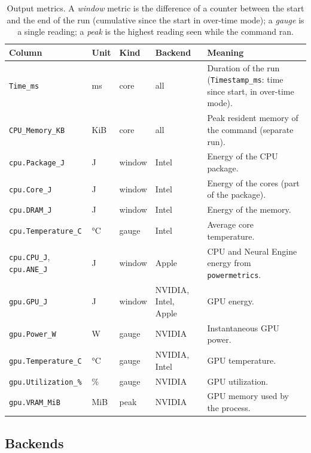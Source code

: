 \begin{table}[t]
    \centering
    \caption{Output metrics. A \emph{window} metric is the difference of a counter between the start and the end of the run (cumulative since the start in over-time mode); a \emph{gauge} is a single reading; a \emph{peak} is the highest reading seen while the command ran.}
    \label{table:metrics}
    \small
    \begin{tabularx}{\textwidth}{@{}l l l l X@{}}
        \toprule
        \textbf{Column} & \textbf{Unit} & \textbf{Kind} & \textbf{Backend} & \textbf{Meaning} \\
        \midrule
        \texttt{Time\_ms} & ms & core & all & Duration of the run (\texttt{Timestamp\_ms}: time since start, in over-time mode). \\
        \texttt{CPU\_Memory\_KB} & KiB & core & all & Peak resident memory of the command (separate run). \\
        \texttt{cpu.Package\_J} & J & window & Intel & Energy of the CPU package. \\
        \texttt{cpu.Core\_J} & J & window & Intel & Energy of the cores (part of the package). \\
        \texttt{cpu.DRAM\_J} & J & window & Intel & Energy of the memory. \\
        \texttt{cpu.Temperature\_C} & \si{\celsius} & gauge & Intel & Average core temperature. \\
        \texttt{cpu.CPU\_J}, \texttt{cpu.ANE\_J} & J & window & Apple & CPU and Neural Engine energy from \texttt{powermetrics}. \\
        \texttt{gpu.GPU\_J} & J & window & NVIDIA, Intel, Apple & GPU energy. \\
        \texttt{gpu.Power\_W} & W & gauge & NVIDIA & Instantaneous GPU power. \\
        \texttt{gpu.Temperature\_C} & \si{\celsius} & gauge & NVIDIA, Intel & GPU temperature. \\
        \texttt{gpu.Utilization\_\%} & \% & gauge & NVIDIA & GPU utilization. \\
        \texttt{gpu.VRAM\_MiB} & MiB & peak & NVIDIA & GPU memory used by the process. \\
        \bottomrule
    \end{tabularx}
\end{table}

\subsection{Backends}
\label{sec:backends}


